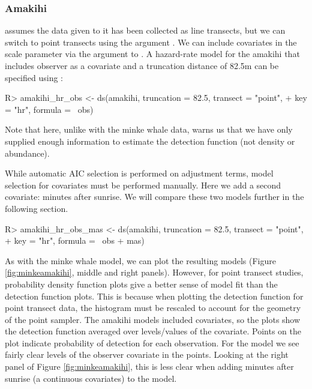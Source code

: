 \documentclass[article]{jss}
\begin{document}
\subsubsection{Amakihi}

 assumes the data given to it has been collected as line transects, but we can switch to point transects using the argument . We can include covariates in the scale parameter via the  argument to . A hazard-rate model for the amakihi that includes observer as a covariate and a truncation distance of 82.5m \citep{Marques:2007ey} can be specified using :
\begin{Schunk}
\begin{Sinput}
R> amakihi_hr_obs <- ds(amakihi, truncation = 82.5, transect = "point",
+                      key = "hr", formula = ~obs)
\end{Sinput}
\end{Schunk}
Note that here, unlike with the minke whale data,  warns us that we have only supplied enough information to estimate the detection function (not density or abundance).

While automatic AIC selection is performed on adjustment terms, model selection for covariates must be performed manually. Here we add a second covariate: minutes after sunrise. We will compare these two models further in the following section.
\begin{Schunk}
\begin{Sinput}
R> amakihi_hr_obs_mas <- ds(amakihi, truncation = 82.5, transect = "point",
+                          key = "hr", formula = ~obs + mas)
\end{Sinput}
\end{Schunk}
As with the minke whale model, we can plot the resulting models (Figure \ref{fig:minkeamakihi}, middle and right panels). However, for point transect studies, probability density function plots give a better sense of model fit than the detection function plots. This is because when plotting the detection function for point transect data, the histogram must be rescaled to account for the geometry of the point sampler. The amakihi models included covariates, so the plots show the detection function averaged over levels/values of the covariate. Points on the plot indicate probability of detection for each observation. For the  model we see fairly clear levels of the observer covariate in the points. Looking at the right panel of Figure \ref{fig:minkeamakihi}, this is less clear when adding minutes after sunrise (a continuous covariates) to the model.
\end{document}
